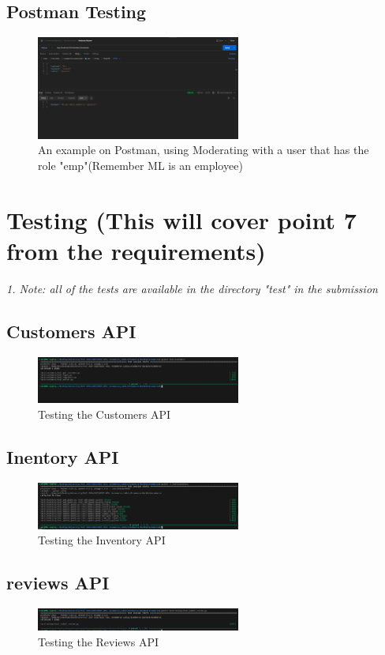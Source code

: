 \documentclass[a4paper,12pt]{article}
\begin{document}
\subsection{Postman Testing}
\begin{figure}[H]
  \centering
  \includegraphics[width=0.6\textwidth]{images/33.png}
  \caption{An example on Postman, using Moderating with a user that has the role "emp"(Remember ML is an employee)}
\end{figure}
\section{Testing (This will cover point 7 from the requirements)}
\textit{1. Note: all of the tests are available in the directory "test" in the submission}
\subsection{Customers API}
\begin{figure}[H]
  \centering
  \includegraphics[width=0.6\textwidth]{images/34.png}
  \caption{Testing the Customers API}
\end{figure}
\subsection{Inentory API}
\begin{figure}[H]
  \centering
  \includegraphics[width=0.6\textwidth]{images/35.png}
  \caption{Testing the Inventory API}
\end{figure}
\subsection{reviews API}
\begin{figure}[H]
  \centering
  \includegraphics[width=0.6\textwidth]{images/36.png}
  \caption{Testing the Reviews API}
\end{figure}
\end{document}
